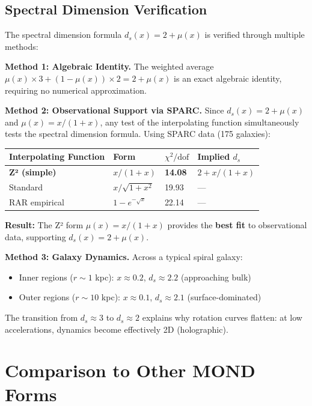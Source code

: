 \documentclass[11pt,a4paper]{article}
\theoremstyle{plain}
\theoremstyle{definition}
\theoremstyle{remark}
\begin{document}
\subsection{Spectral Dimension Verification}

The spectral dimension formula $d_s(x) = 2 + \mu(x)$ is verified through multiple methods:

\textbf{Method 1: Algebraic Identity.}
The weighted average $\mu(x) \times 3 + (1-\mu(x)) \times 2 = 2 + \mu(x)$ is an exact algebraic identity, requiring no numerical approximation.

\textbf{Method 2: Observational Support via SPARC.}
Since $d_s(x) = 2 + \mu(x)$ and $\mu(x) = x/(1+x)$, any test of the interpolating function simultaneously tests the spectral dimension formula. Using SPARC data (175 galaxies):

\begin{center}
\begin{tabular}{llll}
\toprule
\textbf{Interpolating Function} & \textbf{Form} & $\chi^2/\text{dof}$ & \textbf{Implied $d_s$} \\
\midrule
\textbf{Z² (simple)} & $x/(1+x)$ & \textbf{14.08} & $2 + x/(1+x)$ \\
Standard & $x/\sqrt{1+x^2}$ & 19.93 & --- \\
RAR empirical & $1 - e^{-\sqrt{x}}$ & 22.14 & --- \\
\bottomrule
\end{tabular}
\end{center}

\textbf{Result:} The Z² form $\mu(x) = x/(1+x)$ provides the \textbf{best fit} to observational data, supporting $d_s(x) = 2 + \mu(x)$.

\textbf{Method 3: Galaxy Dynamics.}
Across a typical spiral galaxy:
\begin{itemize}
  \item Inner regions ($r \sim 1$ kpc): $x \approx 0.2$, $d_s \approx 2.2$ (approaching bulk)
  \item Outer regions ($r \sim 10$ kpc): $x \approx 0.1$, $d_s \approx 2.1$ (surface-dominated)
\end{itemize}

The transition from $d_s \approx 3$ to $d_s \approx 2$ explains why rotation curves flatten: at low accelerations, dynamics become effectively 2D (holographic).

\section{Comparison to Other MOND Forms}
\end{document}
